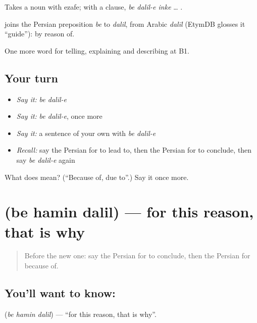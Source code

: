 Takes a noun with ezafe; with a clause, \emph{be dalil-e inke} … .

\begin{cousinweb}
\textbf{ } joins the Persian preposition \emph{be} to \emph{dalil}, from Arabic \emph{dalīl} (EtymDB glosses it \textquotedblleft{}guide\textquotedblright{}): by reason of.
\end{cousinweb}

\begin{grammarlens}[title={What you've built}]
One more word for telling, explaining and describing at B1.
\end{grammarlens}

\subsection*{Your turn}
\begin{itemize}
\raggedright
  \item \emph{Say it:} \emph{be dalil-e}
  \item \emph{Say it:} \emph{be dalil-e}, once more
  \item \emph{Say it:} a sentence of your own with \emph{be dalil-e}
  \item \emph{Recall:} say the Persian for to lead to, then the Persian for to conclude, then say \emph{be dalil-e} again
\end{itemize}

\begin{tcolorbox}[breakable,colback=teal!4,colframe=teal!35!black,title={Before you move on}]
What does   mean? (\textquotedblleft{}Because of, due to\textquotedblright{}.) Say it once more.
\end{tcolorbox}
\section[\texorpdfstring{\fa{به} \fa{همین} \fa{دلیل} (be hamin dalil)}{به همین دلیل (be hamin dalil)}]{   (be hamin dalil) — for this reason, that is why}

\label{lesson:FA-C371-be-hamin-dalil}



\begin{quote}
Before the new one: say the Persian for to conclude, then the Persian for because of.
\end{quote}

\subsection*{You'll want to know:   }
\textbf{  } (\emph{be hamin dalil}) — \textquotedblleft{}for this reason, that is why\textquotedblright{}.


